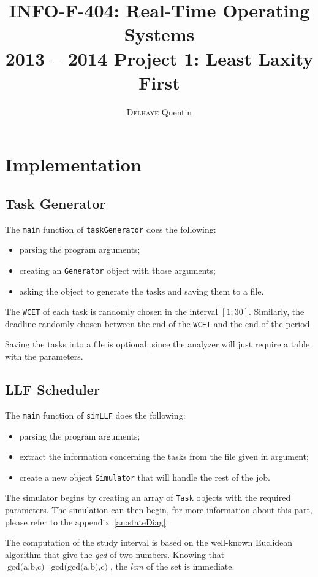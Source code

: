\documentclass[a4paper,11pt]{article}
\title{INFO-F-404: Real-Time Operating Systems\\2013 -- 2014 Project 1: Least Laxity First}
\author{\textsc{Delhaye} Quentin}
\begin{document}
    \maketitle
    \section{Implementation}
    \subsection{Task Generator}
    The \texttt{main} function of \texttt{taskGenerator} does the following:
    \begin{itemize}
    \item parsing the program arguments;
    \item creating an \texttt{Generator} object with those arguments;
    \item asking the object to generate the tasks and saving them to a file.
    \end{itemize}
     
    The \texttt{WCET} of each task is randomly chosen in the interval $[1;30]$. Similarly, the deadline randomly chosen between the end of the \texttt{WCET} and the end of the period.
     
    Saving the tasks into a file is optional, since the analyzer will just require a table with the parameters.
     
    \subsection{LLF Scheduler}
    The \texttt{main} function of \texttt{simLLF} does the following:
    \begin{itemize}
    \item parsing the program arguments;
    \item extract the information concerning the tasks from the file given in argument;
    \item create a new object \texttt{Simulator} that will handle the rest of the job.
    \end{itemize}
     
    The simulator begins by creating an array of \texttt{Task} objects with the required parameters. The simulation can then begin, for more information about this part, please refer to the appendix~\ref{an:stateDiag}.
     
    The computation of the study interval is based on the well-known Euclidean algorithm that give the \textit{gcd} of two numbers. Knowing that $\mbox{gcd(a,b,c)} = \mbox{gcd(gcd(a,b),c)}$, the \textit{lcm} of the set is immediate.
     
\end{document}
